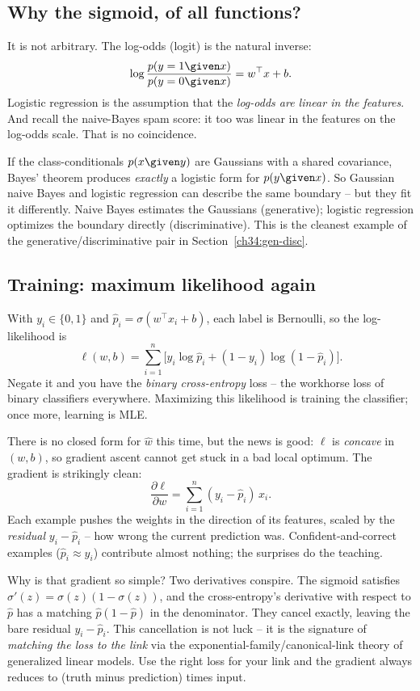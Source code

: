 \subsection{Why the sigmoid, of all functions?}

It is not arbitrary. The log-odds (logit) is the natural inverse:
\[
  \log\frac{p(y=1\given x)}{p(y=0\given x)} = w^\top x + b.
\]
Logistic regression is the assumption that the \emph{log-odds are linear in the
features}. And recall the naive-Bayes spam score: it too was linear in the
features on the log-odds scale. That is no coincidence.

\begin{connectionbox}
If the class-conditionals $p(x\given y)$ are Gaussians with a shared covariance,
Bayes' theorem produces \emph{exactly} a logistic form for $p(y\given x)$. So
Gaussian naive Bayes and logistic regression can describe the same boundary --
but they fit it differently. Naive Bayes estimates the Gaussians (generative);
logistic regression optimizes the boundary directly (discriminative). This is
the cleanest example of the generative/discriminative pair in
Section~\ref{ch34:gen-disc}.
\end{connectionbox}

\subsection{Training: maximum likelihood again}

With $y_i\in\{0,1\}$ and $\hat p_i = \sigma(w^\top x_i + b)$, each label is
Bernoulli, so the log-likelihood is
\[
  \ell(w,b) = \sum_{i=1}^n \big[y_i\log\hat p_i + (1-y_i)\log(1-\hat p_i)\big].
\]
Negate it and you have the \emph{binary cross-entropy} loss -- the workhorse loss
of binary classifiers everywhere. Maximizing this likelihood is training the
classifier; once more, learning is MLE.

There is no closed form for $\hat w$ this time, but the news is good: $\ell$ is
\emph{concave} in $(w,b)$, so gradient ascent cannot get stuck in a bad local
optimum. The gradient is strikingly clean:
\[
  \frac{\partial \ell}{\partial w} = \sum_{i=1}^n (y_i - \hat p_i)\,x_i.
\]
Each example pushes the weights in the direction of its features, scaled by the
\emph{residual} $y_i - \hat p_i$ -- how wrong the current prediction was.
Confident-and-correct examples ($\hat p_i\approx y_i$) contribute almost nothing;
the surprises do the teaching.

\begin{whybox}
Why is that gradient so simple? Two derivatives conspire. The sigmoid satisfies
$\sigma'(z) = \sigma(z)(1-\sigma(z))$, and the cross-entropy's derivative with
respect to $\hat p$ has a matching $\hat p(1-\hat p)$ in the denominator. They
cancel exactly, leaving the bare residual $y_i-\hat p_i$. This cancellation is
not luck -- it is the signature of \emph{matching the loss to the link} via the
exponential-family/canonical-link theory of generalized linear models. Use the
right loss for your link and the gradient always reduces to (truth minus
prediction) times input.
\end{whybox}

